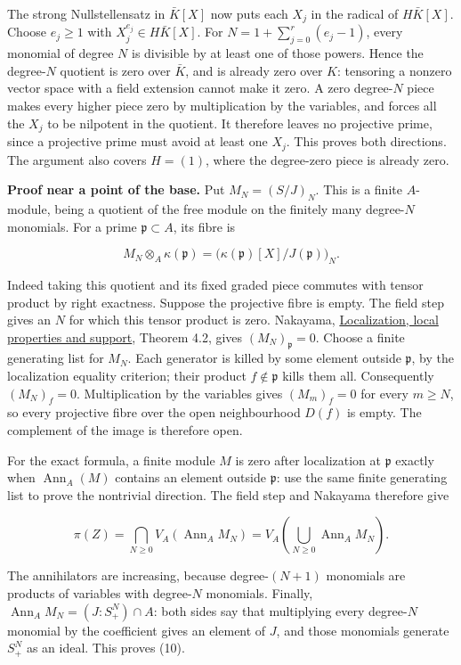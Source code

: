 \documentclass[
]{article}
\begin{document}
The strong Nullstellensatz in \(\bar K[X]\) now puts each \(X_j\) in the
radical of \(H\bar K[X]\). Choose \(e_j\ge1\) with
\(X_j^{e_j}\in H\bar K[X]\). For \(N=1+\sum_{j=0}^r(e_j-1)\), every
monomial of degree \(N\) is divisible by at least one of those powers.
Hence the degree-\(N\) quotient is zero over \(\bar K\), and is already
zero over \(K\): tensoring a nonzero vector space with a field extension
cannot make it zero. A zero degree-\(N\) piece makes every higher piece
zero by multiplication by the variables, and forces all the \(X_j\) to
be nilpotent in the quotient. It therefore leaves no projective prime,
since a projective prime must avoid at least one \(X_j\). This proves
both directions. The argument also covers \(H=(1)\), where the
degree-zero piece is already zero.

\textbf{Proof near a point of the base.} Put \(M_N=(S/J)_N\). This is a
finite \(A\)-module, being a quotient of the free module on the finitely
many degree-\(N\) monomials. For a prime \(\mathfrak p\subset A\), its
fibre is

\[
M_N\otimes_A\kappa(\mathfrak p)
=\bigl(\kappa(\mathfrak p)[X]/J(\mathfrak p)\bigr)_N.
\]

Indeed taking this quotient and its fixed graded piece commutes with
tensor product by right exactness. Suppose the projective fibre is
empty. The field step gives an \(N\) for which this tensor product is
zero. Nakayama,
\href{../prerequisites/AG-CA/AG-CA-02.html}{Localization, local
properties and support}, Theorem 4.2, gives \((M_N)_{\mathfrak p}=0\).
Choose a finite generating list for \(M_N\). Each generator is killed by
some element outside \(\mathfrak p\), by the localization equality
criterion; their product \(f\notin\mathfrak p\) kills them all.
Consequently \((M_N)_f=0\). Multiplication by the variables gives
\((M_m)_f=0\) for every \(m\ge N\), so every projective fibre over the
open neighbourhood \(D(f)\) is empty. The complement of the image is
therefore open.

For the exact formula, a finite module \(M\) is zero after localization
at \(\mathfrak p\) exactly when \(\operatorname{Ann}_A(M)\) contains an
element outside \(\mathfrak p\): use the same finite generating list to
prove the nontrivial direction. The field step and Nakayama therefore
give

\[
\pi(Z)=\bigcap_{N\ge0}V_A(\operatorname{Ann}_A M_N)
=V_A\left(\bigcup_{N\ge0}\operatorname{Ann}_A M_N\right).
\]

The annihilators are increasing, because degree-\((N+1)\) monomials are
products of variables with degree-\(N\) monomials. Finally,
\(\operatorname{Ann}_A M_N=(J:S_+^N)\cap A\): both sides say that
multiplying every degree-\(N\) monomial by the coefficient gives an
element of \(J\), and those monomials generate \(S_+^N\) as an ideal.
This proves (10).
\end{document}

